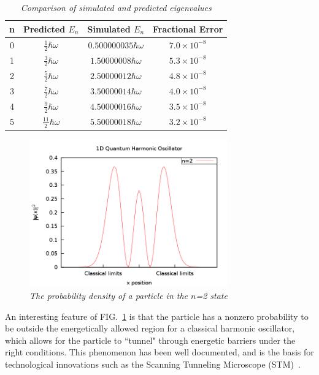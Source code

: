\documentclass[aps,prl,twocolumn,superscriptaddress]{revtex4-1}
\begin{document}
\begin{table}[h!]
\label{data}
\begin{center}
\begin{tabular}{|c|c|c|c|} 
\hline
n  & Predicted $E_n$  & Simulated $E_n$    & Fractional Error \\
\hline\hline
0  & $\frac{1}{2}\hbar\omega$ & $0.500000035\hbar\omega$ & $7.0\times10^{-8}$\\
\hline
1  & $\frac{3}{2}\hbar\omega$ & $1.50000008\hbar\omega$ & $5.3\times10^{-8}$\\
\hline
2  & $\frac{5}{2}\hbar\omega$ & $2.50000012\hbar\omega$ & $4.8\times10^{-8}$\\
\hline
3  & $\frac{7}{2}\hbar\omega$ & $3.50000014\hbar\omega$ & $4.0\times10^{-8}$\\
\hline
4  & $\frac{9}{2}\hbar\omega$ & $4.50000016\hbar\omega$ & $3.5\times10^{-8}$\\
\hline
5  & $\frac{11}{2}\hbar\omega$ & $5.50000018\hbar\omega$ & $3.2\times10^{-8}$\\
\hline
\end{tabular}
\caption{\it\small{Comparison of simulated and predicted eigenvalues}}
\end{center}
\end{table}
\begin{figure}[h!]
 \centering
 \includegraphics[width=3.35in]{harmOsc2n.png}
 \caption{\it \small{The probability density of a particle in the $n$=2 state}}
 \label{fig:harmOsc2n}
\end{figure}
\newpage
An interesting feature of FIG.~\ref{fig:harmOsc2n} is that the particle has a nonzero probability to be outside the 
energetically allowed region for a classical harmonic oscillator, which allows for the particle to ``tunnel" through 
energetic barriers under the right conditions. This phenomenon has been well documented, and is the basis for technological 
innovations such as the Scanning Tunneling Microscope (STM)~\cite{STM}. 
\end{document}
